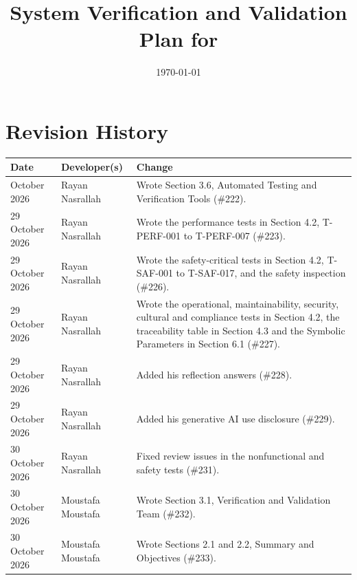 \documentclass[12pt, titlepage]{article}
\begin{document}
\setlength{\emergencystretch}{3em}

\title{System Verification and Validation Plan for \progname{}} 
\author{\authname}
\date{\today}
	
\hypersetup{pageanchor=false}
\maketitle
\hypersetup{pageanchor=true}


\section*{Revision History}

{\small
\def\theHtable{rev.\arabic{table}}
\begin{longtable}{@{}p{3cm}>{\raggedright\arraybackslash}p{3.3cm}
>{\raggedright\arraybackslash}p{\dimexpr\textwidth-6.3cm-4\tabcolsep\relax}@{}}
\toprule \textbf{Date} & \textbf{Developer(s)} & \textbf{Change}\\
\midrule
\endhead
\bottomrule
\endlastfoot
29 October 2026 & Rayan Nasrallah & Wrote Section 3.6, Automated Testing and
Verification Tools (\#222).\\
29 October 2026 & Rayan Nasrallah & Wrote the performance tests in Section
4.2, T-PERF-001 to T-PERF-007 (\#223).\\
29 October 2026 & Rayan Nasrallah & Wrote the safety-critical tests in Section
4.2, T-SAF-001 to T-SAF-017, and the safety inspection (\#226).\\
29 October 2026 & Rayan Nasrallah & Wrote the operational, maintainability,
security, cultural and compliance tests in Section 4.2, the traceability
table in Section 4.3 and the Symbolic Parameters in Section 6.1 (\#227).\\
29 October 2026 & Rayan Nasrallah & Added his reflection answers (\#228).\\
29 October 2026 & Rayan Nasrallah & Added his generative AI use disclosure
(\#229).\\
30 October 2026 & Rayan Nasrallah & Fixed review issues in the nonfunctional
and safety tests (\#231).\\
30 October 2026 & Moustafa Moustafa & Wrote Section 3.1, Verification and
Validation Team (\#232).\\
30 October 2026 & Moustafa Moustafa & Wrote Sections 2.1 and 2.2, Summary and
Objectives (\#233).\\

\end{longtable}}
\end{document}
